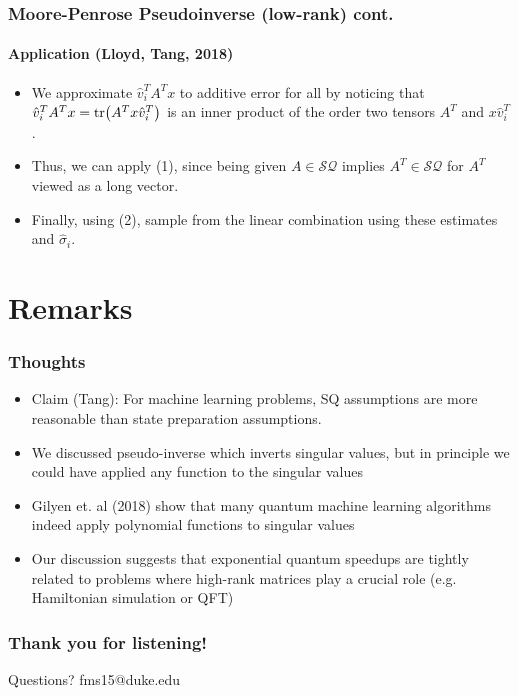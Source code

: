 \documentclass{beamer}
\newcommand\0{\mathbf{0}}
\newcommand\<{\langle}
\renewcommand\>{\rangle}
\begin{document}
\begin{frame}
\frametitle{Moore-Penrose Pseudoinverse (low-rank) cont.} 	
\framesubtitle{Application (Lloyd, Tang, 2018)}
\begin{itemize}
\item We approximate $\hat{v}_i^TA^Tx$ to additive error for all by noticing that $\hat{v}_i^TA^Tx = \tr(A^Tx\hat{v}_i^T)$ is an inner product of the order two tensors $A^T$ and $x\hat{v}_i^T$. 
\item Thus, we can apply (1), since being given $A \in \mathcal{SQ}$ implies $A^T \in \mathcal{SQ}$ for $A^T$ viewed as a long vector. 
\item Finally, using (2), sample from the linear combination using these estimates and $\hat{\sigma}_i$.	
\end{itemize}
\end{frame}

\section{Remarks}

\begin{frame}
\frametitle{Thoughts}	

\begin{itemize}
\item Claim (Tang): For machine learning problems, SQ assumptions are more reasonable than state preparation assumptions.
\item We discussed pseudo-inverse which inverts singular values, but in principle we could have applied any function to the singular values
\item Gilyen et. al (2018) show that many quantum machine learning algorithms indeed apply polynomial functions to singular values
\item Our discussion suggests that exponential quantum speedups are tightly related to problems where high-rank matrices play a crucial role (e.g. Hamiltonian simulation or QFT)
\end{itemize}
\end{frame}

\begin{frame}
\frametitle{Thank you for listening!}

Questions? fms15@duke.edu	
\end{frame}




\end{document}
